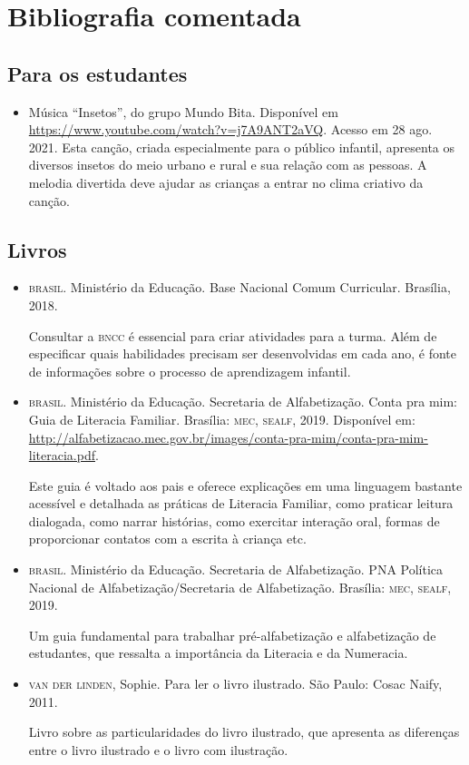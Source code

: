 \documentclass[11pt]{extarticle}
\begin{document}
\section{Bibliografia comentada}

\subsection{Para os estudantes}
\begin{itemize}
\item Música ``Insetos'', do grupo Mundo Bita. Disponível em \url{https://www.youtube.com/watch?v=j7A9ANT2aVQ}. Acesso em 28 ago. 2021. 
Esta canção, criada especialmente para o público infantil, apresenta os diversos insetos do meio urbano e rural e sua relação com as pessoas. A melodia divertida deve ajudar as crianças a entrar no clima criativo da canção. 

\end{itemize}

\subsection{Livros}

\begin{itemize}
\item \textsc{brasil}. Ministério da Educação. Base Nacional Comum Curricular. Brasília, 2018.

Consultar a \textsc{bncc} é essencial para criar atividades para a turma. Além de especificar 
quais habilidades precisam ser desenvolvidas em cada ano, é fonte de informações sobre 
o processo de aprendizagem infantil. 

\item \textsc{brasil}. Ministério da Educação. Secretaria de Alfabetização. Conta pra mim: Guia de Literacia Familiar. 
Brasília: \textsc{mec, sealf}, 2019. Disponível em: \url{http://alfabetizacao.mec.gov.br/images/conta-pra-mim/conta-pra-mim-literacia.pdf}.

Este guia é voltado aos pais e oferece explicações em uma linguagem bastante acessível e detalhada as práticas de Literacia Familiar, 
como praticar leitura dialogada, como narrar histórias, como exercitar interação oral, formas de proporcionar contatos com a escrita à criança etc. 
 
\item \textsc{brasil}. Ministério da Educação. Secretaria de Alfabetização. PNA Política Nacional de Alfabetização/Secretaria 
de Alfabetização. Brasília: \textsc{mec, sealf}, 2019.

Um guia fundamental para trabalhar pré-alfabetização e alfabetização de estudantes, que ressalta a importância da Literacia e da Numeracia. 

\item \textsc{van der linden}, Sophie. Para ler o livro ilustrado. São Paulo: Cosac Naify, 2011.

Livro sobre as particularidades do livro ilustrado, que apresenta as diferenças entre o livro ilustrado e o livro com ilustração. 
\end{itemize}
\end{document}
